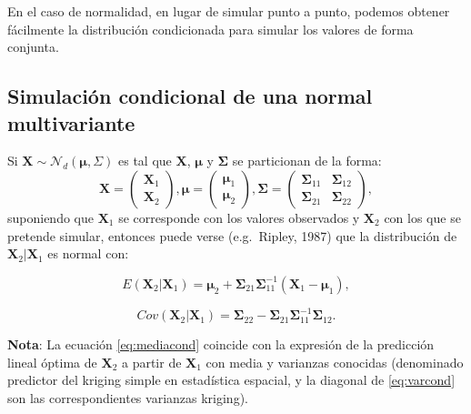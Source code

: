 \documentclass[]{book}
\theoremstyle{definition}
\theoremstyle{definition}
\theoremstyle{definition}
\theoremstyle{remark}
\begin{document}
En el caso de normalidad, en lugar de simular punto a punto, podemos
obtener fácilmente la distribución condicionada para simular los valores
de forma conjunta.

\subsection{Simulación condicional de una normal
multivariante}\label{condnormal}

Si \(\mathbf{X} \sim \mathcal{N}_d\left( \boldsymbol\mu,\Sigma \right)\)
es tal que \(\mathbf{X}\), \(\boldsymbol\mu\) y \(\boldsymbol\Sigma\) se
particionan de la forma: \[\mathbf{X} =
\begin{pmatrix}
 \mathbf{X}_1 \\
 \mathbf{X}_2
\end{pmatrix},  
\boldsymbol\mu =
\begin{pmatrix}
 \boldsymbol\mu_1 \\
 \boldsymbol\mu_2
\end{pmatrix}, 
\boldsymbol\Sigma =
\begin{pmatrix}
 \boldsymbol\Sigma_{11} & \boldsymbol\Sigma_{12} \\
 \boldsymbol\Sigma_{21} & \boldsymbol\Sigma_{22}
\end{pmatrix},\] suponiendo que \(\mathbf{X}_1\) se corresponde con los
valores observados y \(\mathbf{X}_2\) con los que se pretende simular,
entonces puede verse (e.g.~Ripley, 1987) que la distribución de
\(\mathbf{X}_2 | \mathbf{X}_1\) es normal con:

\begin{equation}
E \left( \mathbf{X}_2 | \mathbf{X}_1 \right) = \boldsymbol\mu_2 + \boldsymbol\Sigma_{21} \boldsymbol\Sigma_{11}^{-1}
\left(  \mathbf{X}_1 - \boldsymbol\mu_1 \right), 
\label{eq:mediacond}
\end{equation}

\begin{equation}
Cov \left( \mathbf{X}_2 | \mathbf{X}_1 \right) =
\boldsymbol\Sigma_{22} - \boldsymbol\Sigma_{21} \boldsymbol\Sigma_{11}^{-1} \boldsymbol\Sigma_{12}.
\label{eq:varcond}
\end{equation}

\textbf{Nota}: La ecuación \eqref{eq:mediacond} coincide con la expresión
de la predicción lineal óptima de \(\mathbf{X}_2\) a partir de
\(\mathbf{X}_1\) con media y varianzas conocidas (denominado predictor
del kriging simple en estadística espacial, y la diagonal de
\eqref{eq:varcond} son las correspondientes varianzas kriging).
\end{document}
